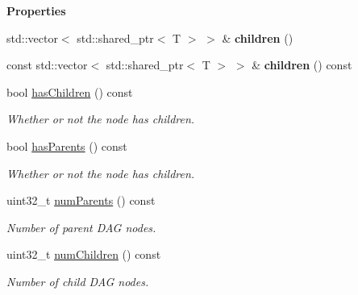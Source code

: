 \begin{Indent}\textbf{ Properties}\par
\begin{DoxyCompactItemize}
\item 
\mbox{\label{classrev_1_1_dag_node_a217e0cc1cf2cfad0dcf14e7569242ef9}} 
std\+::vector$<$ std\+::shared\+\_\+ptr$<$ T $>$ $>$ \& {\bfseries children} ()
\item 
\mbox{\label{classrev_1_1_dag_node_a5f9354c47c578479715698bb87bbca4d}} 
const std\+::vector$<$ std\+::shared\+\_\+ptr$<$ T $>$ $>$ \& {\bfseries children} () const
\item 
\mbox{\label{classrev_1_1_dag_node_a2a9d170eeddde06012827de41c289e10}} 
bool \mbox{\hyperlink{classrev_1_1_dag_node_a2a9d170eeddde06012827de41c289e10}{has\+Children}} () const
\begin{DoxyCompactList}\small\item\em Whether or not the node has children. \end{DoxyCompactList}\item 
\mbox{\label{classrev_1_1_dag_node_a6e103169ef2a59a950e92633b6d8d464}} 
bool \mbox{\hyperlink{classrev_1_1_dag_node_a6e103169ef2a59a950e92633b6d8d464}{has\+Parents}} () const
\begin{DoxyCompactList}\small\item\em Whether or not the node has children. \end{DoxyCompactList}\item 
\mbox{\label{classrev_1_1_dag_node_a1a3f838d4135ba9e85a245c9645cde37}} 
uint32\+\_\+t \mbox{\hyperlink{classrev_1_1_dag_node_a1a3f838d4135ba9e85a245c9645cde37}{num\+Parents}} () const
\begin{DoxyCompactList}\small\item\em Number of parent D\+AG nodes. \end{DoxyCompactList}\item 
\mbox{\label{classrev_1_1_dag_node_a695b66b608ea619afed26a4dd964145b}} 
uint32\+\_\+t \mbox{\hyperlink{classrev_1_1_dag_node_a695b66b608ea619afed26a4dd964145b}{num\+Children}} () const
\begin{DoxyCompactList}\small\item\em Number of child D\+AG nodes. \end{DoxyCompactList}\end{DoxyCompactItemize}
\end{Indent}
